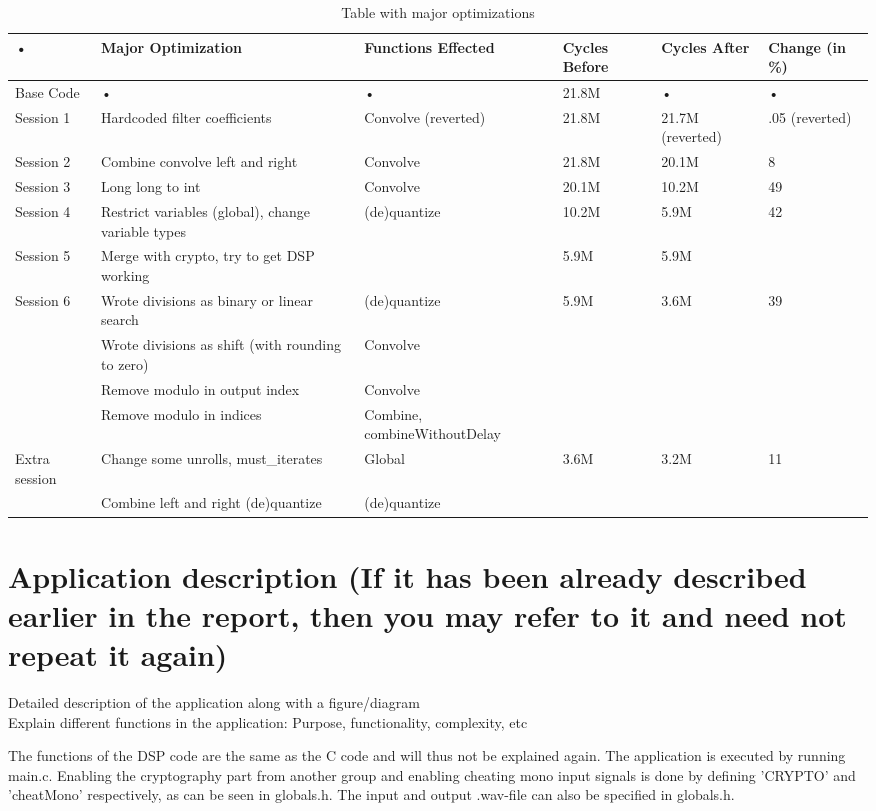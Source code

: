 \documentclass[a4paper]{article}
\begin{document}
\begin{table}
\begin{tabular}{|p{2cm}|p{3cm}|p{3cm}|p{2cm}|p{2cm}|p{1cm}|}
\hline 
• & Major Optimization & Functions Effected & Cycles Before & Cycles After & Change (in \%) \\ 
\hline 
Base Code & • & • & 21.8M & • & • \\ 
\hline 
Session 1 & Hardcoded filter coefficients & Convolve (reverted) & 21.8M & 21.7M (reverted) & .05 (reverted)\\ 
\hline 
Session 2 & Combine convolve left and right & Convolve & 21.8M & 20.1M & 8 \\ 
\hline 
Session 3 & Long long to int & Convolve & 20.1M & 10.2M & 49 \\ 
\hline 
Session 4 & Restrict variables (global), change variable types & (de)quantize & 10.2M & 5.9M & 42 \\ 
\hline 
Session 5 & Merge with crypto, try to get DSP working & & 5.9M & 5.9M & \\
\hline
Session 6 & Wrote divisions as binary or linear search & (de)quantize & 5.9M & 3.6M & 39 \\
\hline
& Wrote divisions as shift (with rounding to zero) & Convolve & & & \\
\hline
& Remove modulo in output index & Convolve & & & \\
\hline
& Remove modulo in indices & Combine, combineWithoutDelay & & & \\
\hline
Extra session & Change some unrolls, must\_iterates & Global & 3.6M & 3.2M & 11 \\
\hline
& Combine left and right (de)quantize & (de)quantize & & & \\
\hline
\end{tabular} 
\caption{Table with major optimizations}
\label{table:optimizations}
\end{table}

\section{Application description (If it has been already described earlier in the report, then you may refer to it and need not repeat it again)}
Detailed description of the application along with a figure/diagram \\
Explain different functions in the application: Purpose, functionality, complexity, etc

The functions of the DSP code are the same as the C code and will thus not be explained again. 
The application is executed by running main.c. Enabling the cryptography part from another group and enabling cheating mono input signals is done by defining 'CRYPTO' and 'cheatMono' respectively, as can be seen in globals.h. The input and output .wav-file can also be specified in globals.h.
\end{document}
